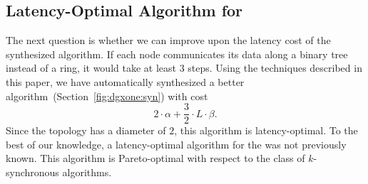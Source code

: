 \subsection{Latency-Optimal Algorithm for \dgxone}
The next question is whether we can improve upon the latency cost of
the synthesized algorithm. If each node communicates its data along a
binary tree instead of a ring, it would take at least $3$ steps. Using
the techniques described in this paper, we have automatically
synthesized a better algorithm~(Section~\ref{fig:dgxone:syn}) with
cost $$2\cdot \alpha + \frac{3}{2}\cdot L \cdot \beta.$$
%
Since the \dgxone topology has a diameter of $2$, this algorithm is
latency-optimal. To the best of our knowledge, a latency-optimal
algorithm for the \dgxone was not previously known. This algorithm is
Pareto-optimal with respect to the class of $k$-synchronous
algorithms.


